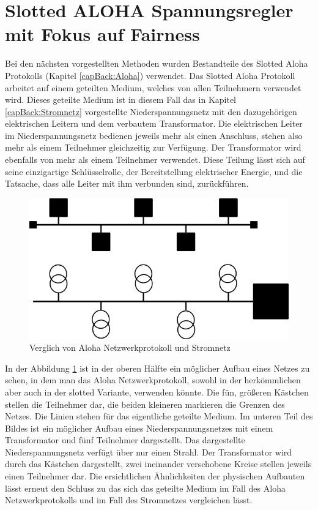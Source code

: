 \section{Slotted ALOHA Spannungsregler mit Fokus auf Fairness}
Bei den nächsten vorgestellten Methoden wurden Bestandteile des Slotted Aloha Protokolls (Kapitel \ref{capBack:Aloha}) verwendet. Das Slotted Aloha Protokoll arbeitet auf einem geteilten Medium, welches von allen Teilnehmern verwendet wird. Dieses geteilte Medium ist in diesem Fall das in Kapitel \ref{capBack:Stromnetz} vorgestellte Niederspannungsnetz mit den dazugehörigen elektrischen Leitern und dem verbautem Transformator. Die elektrischen Leiter im Niederspannungsnetz bedienen jeweils mehr als einen Anschluss, stehen also mehr als einem Teilnehmer gleichzeitig zur Verfügung. Der Transformator wird ebenfalls von mehr als einem Teilnehmer verwendet. Diese Teilung lässt sich auf seine einzigartige Schlüsselrolle, der Bereitstellung elektrischer Energie, und die Tatsache, dass alle Leiter mit ihm verbunden sind, zurückführen.\\
\begin{figure}[htb]
	\centering
	\includegraphics[scale=0.75]{img/sharedMedium.png}
	\caption{Verglich von Aloha Netzwerkprotokoll und Stromnetz}
	\label{Abb_sharedmedium}
\end{figure}
In der Abbildung \ref{Abb_sharedmedium} ist in der oberen Hälfte ein möglicher Aufbau eines Netzes zu sehen, in dem man das Aloha Netzwerkprotokoll, sowohl in der herkömmlichen aber auch in der slotted Variante, verwenden könnte. Die fün, größeren Kästchen stellen die Teilnehmer dar, die beiden kleineren markieren die Grenzen des Netzes. Die Linien stehen für das eigentliche geteilte Medium. Im unteren Teil des Bildes ist ein möglicher Aufbau eines Niederspannungsnetzes mit einem Transformator und fünf Teilnehmer dargestellt. Das dargestellte Niederspannungsnetz verfügt über nur einen Strahl. Der Transformator wird durch das Kästchen dargestellt, zwei ineinander verschobene Kreise stellen jeweils einen Teilnehmer dar. Die ersichtlichen Ähnlichkeiten der physischen Aufbauten lässt erneut den Schluss zu das sich das geteilte Medium im Fall des Aloha Netzwerkprotokolls und im Fall des Stromnetzes vergleichen lässt.\\
